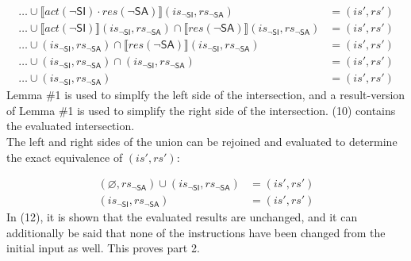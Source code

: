 \documentclass[12pt, letterpaper]{article}
\let\emptyset\varnothing
\newcommand\interp[1]{\llbracket #1 \rrbracket}
\begin{document}
 {\small
 \begin{align}
     \ldots \cup %
     \interp{ \mathit{act}(\neg\mathsf{SI}) \cdot
      \mathit{res}(\neg\mathsf{SA}) } (\mathit{is_{\mathsf{\neg SI}}}, \mathit{rs_{\mathsf{\neg SA}}})
     &=
     (\mathit{is}', \mathit{rs}')
     \\
     \ldots \cup %
     \interp{ \mathit{act}(\neg\mathsf{SI}) } (\mathit{is_{\mathsf{\neg SI}}}, \mathit{rs_{\mathsf{\neg SA}}}) \cap
     \interp{ \mathit{res}(\neg\mathsf{SA}) } (\mathit{is_{\mathsf{\neg SI}}}, \mathit{rs_{\mathsf{\neg SA}}})
     &=
     (\mathit{is}', \mathit{rs}')
     \\
     \ldots \cup %
     (\mathit{is_{\mathsf{\neg SI}}}, \mathit{rs_{\mathsf{\neg SA}}}) \cap
     \interp{ \mathit{res}(\neg\mathsf{SA}) } (\mathit{is_{\mathsf{\neg SI}}}, \mathit{rs_{\mathsf{\neg SA}}})
     &=
     (\mathit{is}', \mathit{rs}')
     \\
     \ldots \cup %
     (\mathit{is_{\mathsf{\neg SI}}}, \mathit{rs_{\mathsf{\neg SA}}}) \cap
     (\mathit{is_{\mathsf{\neg SI}}}, \mathit{rs_{\mathsf{\neg SA}}})
     &=
     (\mathit{is}', \mathit{rs}')
     \\
     \ldots \cup %
     (\mathit{is_{\mathsf{\neg SI}}}, \mathit{rs_{\mathsf{\neg SA}}})
     &=
     (\mathit{is}', \mathit{rs}')
 \end{align}
 }
     Lemma \#1 is used to simplfy the left side of the intersection, and a result-version of Lemma \#1 is used to simplify the right side of the intersection. (10) contains the evaluated intersection.\\
     The left and right sides of the union can be rejoined and evaluated to determine the exact equivalence of $(\mathit{is}', \mathit{rs}')$:
 \par\nobreak
 {\small
 \begin{align}
     (\emptyset, \mathit{rs_{\mathsf{\neg SA}}}) \cup
     (\mathit{is_{\mathsf{\neg SI}}}, \mathit{rs_{\mathsf{\neg SA}}})
     &=
     (\mathit{is}', \mathit{rs}')
     \\
     (\mathit{is_{\mathsf{\neg SI}}}, \mathit{rs_{\mathsf{\neg SA}}})
     &=
     (\mathit{is}', \mathit{rs}')
 \end{align}
 }
     In (12), it is shown that the evaluated results are unchanged, and it can additionally be said that none of the instructions have been changed from the initial input as well.  This proves part 2.
\end{document}
